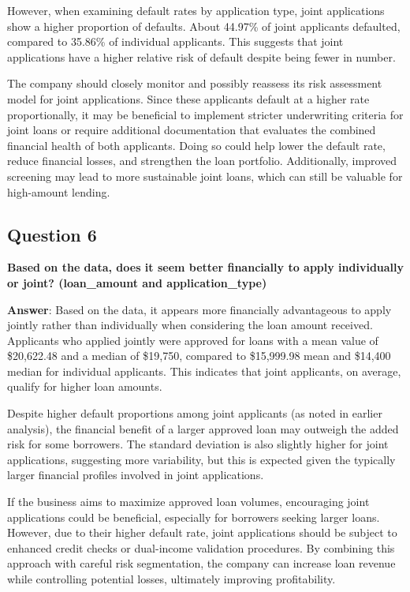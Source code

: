 \documentclass[
]{article}
\begin{document}
However, when examining default rates by application type, joint
applications show a higher proportion of defaults. About 44.97\% of
joint applicants defaulted, compared to 35.86\% of individual
applicants. This suggests that joint applications have a higher relative
risk of default despite being fewer in number.

The company should closely monitor and possibly reassess its risk
assessment model for joint applications. Since these applicants default
at a higher rate proportionally, it may be beneficial to implement
stricter underwriting criteria for joint loans or require additional
documentation that evaluates the combined financial health of both
applicants. Doing so could help lower the default rate, reduce financial
losses, and strengthen the loan portfolio. Additionally, improved
screening may lead to more sustainable joint loans, which can still be
valuable for high-amount lending.

\subsection{Question 6}\label{question-6}

\textbf{Based on the data, does it seem better financially to apply
individually or joint? (loan\_amount and application\_type)}

\textbf{Answer}: Based on the data, it appears more financially
advantageous to apply jointly rather than individually when considering
the loan amount received. Applicants who applied jointly were approved
for loans with a mean value of \$20,622.48 and a median of \$19,750,
compared to \$15,999.98 mean and \$14,400 median for individual
applicants. This indicates that joint applicants, on average, qualify
for higher loan amounts.

Despite higher default proportions among joint applicants (as noted in
earlier analysis), the financial benefit of a larger approved loan may
outweigh the added risk for some borrowers. The standard deviation is
also slightly higher for joint applications, suggesting more
variability, but this is expected given the typically larger financial
profiles involved in joint applications.

If the business aims to maximize approved loan volumes, encouraging
joint applications could be beneficial, especially for borrowers seeking
larger loans. However, due to their higher default rate, joint
applications should be subject to enhanced credit checks or dual-income
validation procedures. By combining this approach with careful risk
segmentation, the company can increase loan revenue while controlling
potential losses, ultimately improving profitability.
\end{document}

